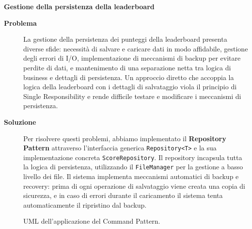 \documentclass[a4paper,12pt]{report}
\begin{document}
\newpage
\noindent
\textbf{Gestione della persistenza della leaderboard}
\begin{description}
	\item[\textbf{Problema}]
	      La gestione della persistenza dei punteggi della leaderboard presenta diverse sfide: necessità di salvare e caricare dati in modo affidabile, gestione degli errori di I/O,
	      implementazione di meccanismi di backup per evitare perdite di dati, e mantenimento di una separazione netta tra logica di business e dettagli di persistenza.
	      Un approccio diretto che accoppia la logica della leaderboard con i dettagli di salvataggio viola il principio di Single Responsibility e rende difficile testare
	      e modificare i meccanismi di persistenza.

	\item[\textbf{Soluzione}]
	      Per risolvere questi problemi, abbiamo implementato il \textbf{Repository Pattern} attraverso l'interfaccia generica \texttt{Repository<T>} e la sua implementazione
	      concreta \texttt{ScoreRepository}. Il repository incapsula tutta la logica di persistenza, utilizzando il \texttt{FileManager} per la gestione a basso livello dei file.
	      Il sistema implementa meccanismi automatici di backup e recovery: prima di ogni operazione di salvataggio viene creata una copia di sicurezza, e in caso di errori
	      durante il caricamento il sistema tenta automaticamente il ripristino dal backup.
\end{description}
\begin{figure}[H]
	\centering{}
	
	\caption{UML dell'applicazione del Command Pattern.}
	\label{img:repository}
\end{figure}


\newpage
\end{document}
